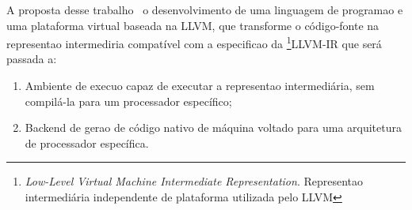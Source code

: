 A proposta desse trabalho \eh\ o desenvolvimento de uma linguagem de programa\ca o e uma plataforma virtual baseada na LLVM, que transforme o c\'odigo-fonte na representa\ca o intermedi\ah ria compat\'ivel com a especifica\ca o da \footnote{\textit{Low-Level Virtual Machine Intermediate Representation}. Representa\ca o intermedi\'aria independente de plataforma utilizada pelo LLVM}{LLVM-IR} que ser\'a passada a:

\begin{enumerate}
\item Ambiente de execu\ca o capaz de executar a representa\ca o intermedi\'aria, sem compil\'a-la para um processador espec\'ifico;
\item Backend de gera\ca o de c\'odigo nativo de m\'aquina voltado para uma arquitetura de processador espec\'ifica.
\end{enumerate}
